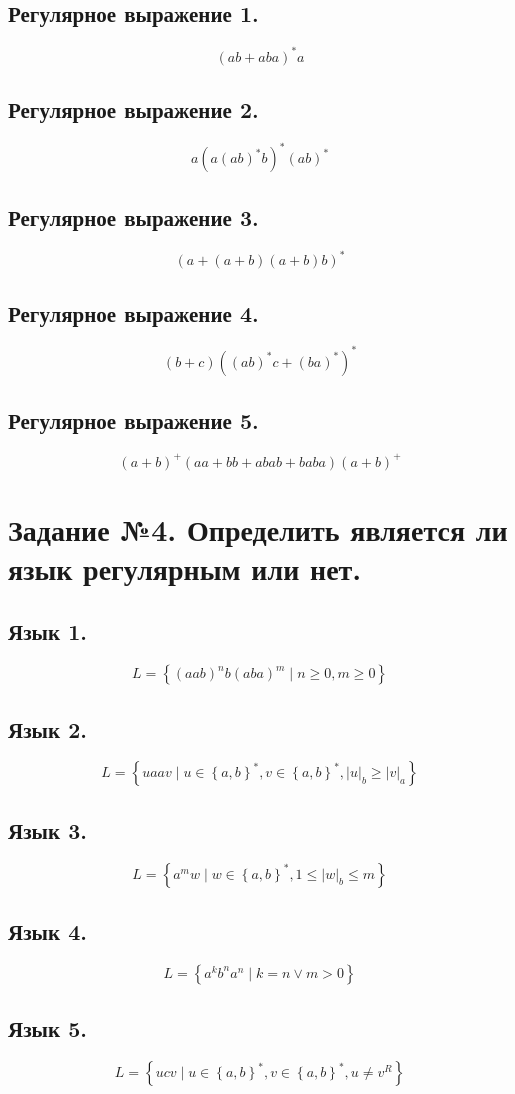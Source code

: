 \documentclass[a4paper]{article}
\begin{document}
\subsection{Регулярное выражение 1.}
$$ (ab + aba)^{*}a $$
\subsection{Регулярное выражение 2.}
$$ a(a (ab)^{*} b)^{*} (ab)^{*} $$
\subsection{Регулярное выражение 3.}
$$ (a + (a + b)(a + b)b)^{*} $$
\subsection{Регулярное выражение 4.}
$$ (b + c) ((ab)^{*}c + (ba)^{*})^{*} $$
\subsection{Регулярное выражение 5.}
$$ (a + b)^{+}(aa+bb+abab+baba)(a+b)^{+} $$

\section{Задание №4. Определить является ли язык регулярным или нет.}


\subsection{Язык 1.}
$$ L = \left\{ (aab)^{n}b(aba)^{m} \mid n \geq 0, m \geq 0 \right\} $$
\subsection{Язык 2.}
$$ L = \left\{ uaav \mid u \in \left\{ a, b \right\}^{*}, v \in \left\{ a, b \right\}^{*}, \left| u \right|_{b} \geq \left| v \right|_{a} \right\} $$
\subsection{Язык 3.}
$$ L = \left\{ a^{m}w \mid w \in \left\{ a, b \right\}^{*}, 1 \leq \left| w \right|_{b} \leq m \right\} $$
\subsection{Язык 4.}
$$ L = \left\{ a^{k}b^{n}a^{n} \mid k = n \vee m > 0 \right\}$$
\subsection{Язык 5.}
$$ L = \left\{ ucv \mid u \in \left\{ a, b \right\}^{*}, v \in \left\{ a, b \right\}^{*}, u \neq v^{R}\right\} $$
\end{document}
